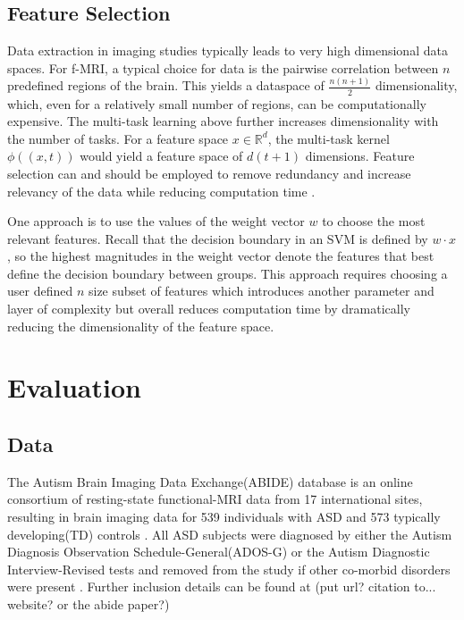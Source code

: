 \documentclass{llncs}
\begin{document}
\subsection{Feature Selection}
\label{subsec:FS}
Data extraction in imaging studies typically leads to very high dimensional data spaces.  For f-MRI, a typical choice for data is the pairwise correlation between $n$ predefined regions of the brain.  This yields a dataspace of $\frac{n(n+1)}{2}$ dimensionality, which, even for a relatively small number of regions, can be  computationally expensive.  The multi-task learning above further increases dimensionality with the number of tasks. For a feature space $x \in \mathbb{R}^d$, the multi-task kernel $\phi((x,t))$ would yield a feature space of $d(t+1)$ dimensions.  Feature selection can and should be employed to remove redundancy and increase relevancy of the data while reducing computation time \cite{featsel}.


One approach is to use the values of the weight vector $w$ to choose the most relevant features.  Recall that the decision boundary in an SVM is defined by $w \cdot x$, so the highest magnitudes in the weight vector denote the features that best define the decision boundary between groups.  This approach requires choosing a user defined $n$ size subset of features which introduces another parameter and layer of complexity but overall reduces computation time by dramatically reducing the dimensionality of the feature space. 
\section{Evaluation}
\subsection{Data}
The Autism Brain Imaging Data Exchange(ABIDE) database is an online consortium of resting-state functional-MRI data from 17 international sites, resulting in brain imaging data for 539 individuals with ASD and 573 typically developing(TD)  controls \cite{abide}. All ASD subjects were diagnosed by either the Autism Diagnosis Observation Schedule-General(ADOS-G) or the Autism Diagnostic Interview-Revised tests and removed from the study if other co-morbid disorders were present \cite{lordADOS} \cite{lordADIR} \cite{abide}.  Further inclusion details can be found at (put url? citation to... website? or the abide paper?)
\end{document}
